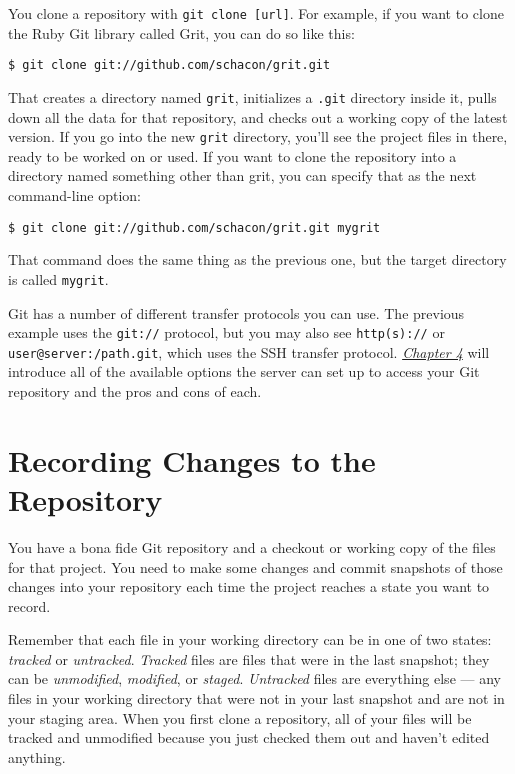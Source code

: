 \documentclass[a4paper]{book}
\newcommand{\prechap}{Chapter }
\newcommand{\postchap}{}
\newcommand{\chapref}[1]{\hyperref[chap:#1]{\prechap #1\postchap}}
\begin{document}
You clone a repository with \texttt{git clone {[}url{]}}. For example, if you want to clone the Ruby Git library called Grit, you can do so like this:

\begin{shaded}\begin{verbatim}
$ git clone git://github.com/schacon/grit.git
\end{verbatim}\end{shaded}

That creates a directory named \texttt{grit}, initializes a \texttt{.git} directory inside it, pulls down all the data for that repository, and checks out a working copy of the latest version. If you go into the new \texttt{grit} directory, you'll see the project files in there, ready to be worked on or used. If you want to clone the repository into a directory named something other than grit, you can specify that as the next command-line option:

\begin{shaded}\begin{verbatim}
$ git clone git://github.com/schacon/grit.git mygrit
\end{verbatim}\end{shaded}

That command does the same thing as the previous one, but the target directory is called \texttt{mygrit}.

Git has a number of different transfer protocols you can use. The previous example uses the \texttt{git://} protocol, but you may also see \texttt{http(s)://} or \texttt{user@server:/path.git}, which uses the SSH transfer protocol. \emph{\chapref{4}} will introduce all of the available options the server can set up to access your Git repository and the pros and cons of each.

\section{Recording Changes to the Repository}\label{recording-changes-to-the-repository}

You have a bona fide Git repository and a checkout or working copy of the files for that project. You need to make some changes and commit snapshots of those changes into your repository each time the project reaches a state you want to record.

Remember that each file in your working directory can be in one of two states: \emph{tracked} or \emph{untracked}. \emph{Tracked} files are files that were in the last snapshot; they can be \emph{unmodified}, \emph{modified}, or \emph{staged}. \emph{Untracked} files are everything else --- any files in your working directory that were not in your last snapshot and are not in your staging area. When you first clone a repository, all of your files will be tracked and unmodified because you just checked them out and haven't edited anything.
\end{document}

